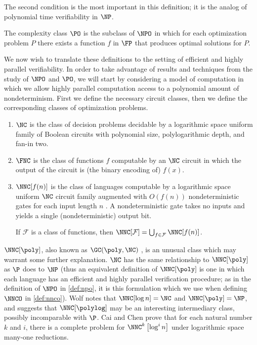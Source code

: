 The second condition is the most important in this definition; it is the analog of polynomial time verifiability in $\NP$.

\begin{definition}
  The complexity class $\PO$ is the subclass of $\NPO$ in which for each optimization problem $P$ there exists a function $f$ in $\FP$ that produces optimal solutions for $P$.
\end{definition}

We now wish to translate these definitions to the setting of efficient and highly parallel verifiability.
In order to take advantage of results and techniques from the study of $\NPO$ and $\PO$, we will start by considering a model of computation in which we allow highly parallel computation access to a polynomial amount of nondeterminism.
First we define the necessary circuit classes, then we define the corresponding classes of optimization problems.

\begin{definition}
  \mbox{}
  \begin{enumerate}
  \item $\NC$ is the class of decision problems decidable by a logarithmic space uniform family of Boolean circuits with polynomial size, polylogarithmic depth, and fan-in two.
  \item $\FNC$ is the class of functions $f$ computable by an $\NC$ circuit in which the output of the circuit is (the binary encoding of) $f(x)$.
  \item $\NNC[f(n)]$ is the class of languages computable by a logarithmic space uniform $\NC$ circuit family augmented with $O(f(n))$ nondeterministic gates for each input length $n$ \cite{wolf94}.
    A nondeterministic gate takes no inputs and yields a single (nondeterministic) output bit.

    If $\mathcal{F}$ is a class of functions, then $\NNC[\mathcal{F}] = \bigcup_{f \in \mathcal{F}} \NNC[f(n)]$.
  \end{enumerate}
\end{definition}

$\NNC[\poly]$, also known as $\GC(\poly, \NC)$ \cite{cc97lim} %
, is an unusual class which may warrant some further explanation.
$\NC$ has the same relationship to $\NNC[\poly]$ as $\P$ does to $\NP$ (thus an equivalent definition of $\NNC[\poly]$ is one in which each language has an efficient and highly parallel verification procedure; as in the definition of $\NPO$ in \autoref{def:npo}, it is this formulation which we use when defining $\NNCO$ in \autoref{def:nnco}).
Wolf \cite{wolf94} notes that $\NNC[\log n]=\NC$ and $\NNC[\poly]=\NP$, and suggests that $\NNC[\polylog]$ may be an interesting intermediary class, possibly incomparable with $\P$.
Cai and Chen \cite{cc97lim} prove that for each natural number $k$ and $i$, there is a complete problem for $\NNC^k\left[\log^i n\right]$ under logarithmic space many-one reductions.

